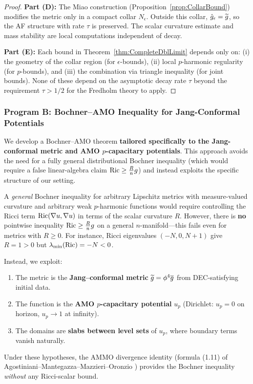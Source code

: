 \begin{proof}
\textbf{Part (D):} The Miao construction (Proposition~\ref{prop:CollarBound}) modifies the metric only in a compact collar $N_\epsilon$. Outside this collar, $\hat{g}_\epsilon = \widetilde{g}$, so the AF structure with rate $\tau$ is preserved. The scalar curvature estimate and mass stability are local computations independent of decay.

\textbf{Part (E):} Each bound in Theorem~\ref{thm:CompleteDblLimit} depends only on: (i) the geometry of the collar region (for $\epsilon$-bounds), (ii) local $p$-harmonic regularity (for $p$-bounds), and (iii) the combination via triangle inequality (for joint bounds). None of these depend on the asymptotic decay rate $\tau$ beyond the requirement $\tau > 1/2$ for the Fredholm theory to apply.
\end{proof}

\subsubsection{Program B: Bochner--AMO Inequality for Jang-Conformal Potentials}
\label{sec:ProgramB}

We develop a Bochner--AMO theorem \textbf{tailored specifically to the Jang-conformal metric and AMO $p$-capacitary potentials}. This approach avoids the need for a fully general distributional Bochner inequality (which would require a false linear-algebra claim $\mathrm{Ric} \ge \frac{R}{n}g$) and instead exploits the specific structure of our setting.

\begin{remark}\label{rem:WhyNotGeneralBochner}
A \emph{general} Bochner inequality for arbitrary Lipschitz metrics with measure-valued curvature and arbitrary weak $p$-harmonic functions would require controlling the Ricci term $\mathrm{Ric}(\nabla u, \nabla u)$ in terms of the scalar curvature $R$. However, there is \textbf{no} pointwise inequality $\mathrm{Ric} \ge \frac{R}{n}g$ on a general $n$-manifold---this fails even for metrics with $R \ge 0$. For instance, Ricci eigenvalues $(-N, 0, N+1)$ give $R = 1 > 0$ but $\lambda_{\min}(\mathrm{Ric}) = -N < 0$.

Instead, we exploit:
\begin{enumerate}
    \item The metric is the \textbf{Jang--conformal metric} $\widetilde{g} = \phi^4 \overline{g}$ from DEC-satisfying initial data.
    \item The function is the \textbf{AMO $p$-capacitary potential} $u_p$ (Dirichlet: $u_p = 0$ on horizon, $u_p \to 1$ at infinity).
    \item The domains are \textbf{slabs between level sets} of $u_p$, where boundary terms vanish naturally.
\end{enumerate}
Under these hypotheses, the AMMO divergence identity (formula (1.11) of Agostiniani--Mantegazza--Mazzieri--Oronzio \cite{amo2024}) provides the Bochner inequality \emph{without} any Ricci-scalar bound.
\end{remark}

